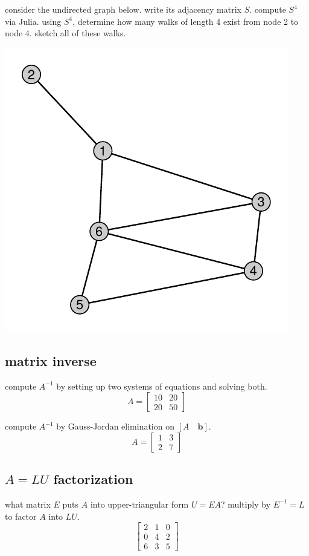 \documentclass[addpoints]{exam}
\begin{document}
\begin{questions}
\question consider the undirected graph below. write its adjacency matrix $S$. compute $S^4$ via Julia. using $S^4$, determine how many walks of length 4 exist from node 2 to node 4. sketch all of these walks.

\begin{center}
	\includegraphics[width=0.5\linewidth]{my_graph.pdf}
\end{center}

\subsection*{matrix inverse}

\question compute $A^{-1}$ by setting up two systems of equations and solving both.
\begin{equation*}
	A = \begin{bmatrix}
	10 & 20  \\
	20 & 50 
	\end{bmatrix}
\end{equation*}

\question compute $A^{-1}$ by Gauss-Jordan elimination on $[A \quad \mathbf{b}]$.
\begin{equation*}
	A = \begin{bmatrix}
	1 & 3  \\
	2 & 7 
	\end{bmatrix}
\end{equation*}

\subsection*{$A=LU$ factorization}

\question what matrix $E$ puts $A$ into upper-triangular form $U=EA$? multiply by $E^{-1}=L$ to factor $A$ into $LU$.
\begin{equation*}
	\begin{bmatrix}
	2 & 1 & 0  \\
	0 & 4 & 2 \\
	6 & 3 & 5
	\end{bmatrix}
\end{equation*}


\end{questions}
\end{document}
